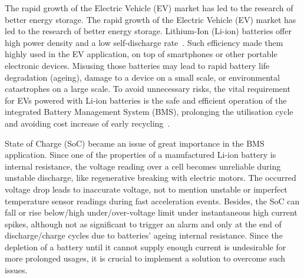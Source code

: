 %
{
The rapid growth of the Electric Vehicle (EV) market has led to the research of better energy storage.
} {
The rapid growth of the Electric Vehicle (EV) market has led to the research of better energy storage.
}
Lithium-Ion (Li-ion) batteries offer high power density and a low self-discharge rate~\cite{han_review, en13082106}.
Such efficiency made them highly used in the EV application, on top of smartphones or other portable electronic devices.
Misusing those batteries may lead to rapid battery life degradation (ageing), damage to a device on a small scale, or environmental catastrophes on a large scale.
To avoid unnecessary risks, the vital requirement for EVs powered with Li-ion batteries is the safe and efficient operation of the integrated Battery Management System (BMS), prolonging the utilisation cycle and avoiding cost increase of early recycling~\cite{skeete_beyond_2020}.

%
State of Charge (SoC) became an issue of great importance in the BMS application.
Since one of the properties of a manufactured Li-ion battery is internal resistance, the voltage reading over a cell becomes unreliable during unstable discharge, like regenerative breaking with electric motors.
The occurred voltage drop leads to inaccurate voltage, not to mention unstable or imperfect temperature sensor readings during fast acceleration events.
Besides, the SoC can fall or rise below/high under/over-voltage limit under instantaneous high current spikes, although not as significant to trigger an alarm and only at the end of discharge/charge cycles due to batteries' ageing internal resistance.
Since the depletion of a battery until it cannot supply enough current is undesirable for more prolonged usages, it is crucial to implement a solution to overcome such issues.

